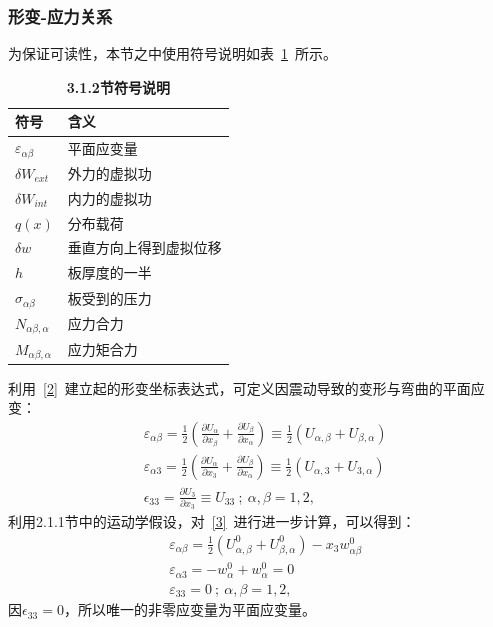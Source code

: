 \documentclass[withoutpreface,bwprint]{cumcmthesis} %
\begin{document}
\subsubsection{形变-应力关系}
为保证可读性，本节之中使用符号说明如表~\ref{table-2}~所示。
\begin{table}[H]
	\caption{\textbf{3.1.2节符号说明}}%
	\centering
	\begin{tabular}{ll}%
		\hline %
		符号   &  含义  \\
		\hline %
		$\varepsilon_{\alpha\beta}$ &平面应变量\\
		$\delta W_{ext}$&外力的虚拟功\\
		$\delta W_{int}$&内力的虚拟功\\
		$q(x)$&分布载荷\\
		$\delta w$&垂直方向上得到虚拟位移\\
		$h$	&板厚度的一半\\
		$\sigma_{\alpha\beta}$&板受到的压力\\
		$N_{\alpha\beta,\alpha}$&应力合力\\
		$M_{\alpha\beta,\alpha}$&应力矩合力\\
		\hline %
	\end{tabular} \label{table-2}
\end{table}
利用~\eqref{2}~建立起的形变坐标表达式，可定义因震动导致的变形与弯曲的平面应变：
\begin{equation}
    \begin{aligned}
&\varepsilon_{\alpha\beta}=\frac{1}{2}\left(\frac{\partial U_\alpha}{\partial x_{\beta}}+\frac{\partial U_{\beta}}{\partial x_\alpha}\right)\equiv\frac{1}{2}\left(U_{\alpha,\beta}+U_{\beta,\alpha}\right)\\
&\varepsilon_{\alpha3}=\frac{1}{2}\left(\frac{\partial U_\alpha}{\partial x_{3}}+\frac{\partial U_{\beta}}{\partial x_\alpha}\right)\equiv\frac{1}{2}\left(U_{\alpha,3}+U_{3,\alpha}\right)\\
&\epsilon_{33}=\frac{\partial U_3}{\partial x_3}\equiv U_{33}~;~\alpha,\beta=1,2,
    \label{3}\end{aligned}
\end{equation}
利用2.1.1节中的运动学假设，对~\eqref{3}~进行进一步计算，可以得到：
\begin{equation}
	\begin{aligned}
&\varepsilon_{\alpha\beta}=\frac{1}{2}(U^0_{\alpha,\beta}+U^0_{\beta,\alpha})-x_{3}w^0_{\alpha\beta}\\
		&\varepsilon_{\alpha3}=-w^0_{\alpha}+w^0_{\alpha}=0\\
		&\varepsilon_{33}=0 ~;~\alpha,\beta=1,2,
	\end{aligned}\label{4}
\end{equation}
因$\epsilon_{33}=0$，所以唯一的非零应变量为平面应变量。
\end{document}
